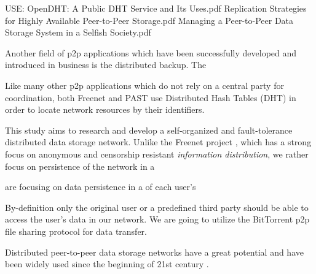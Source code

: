 USE:
OpenDHT: A Public DHT Service and Its Uses.pdf
Replication Strategies for Highly Available Peer-to-Peer Storage.pdf
Managing a Peer-to-Peer Data Storage System in a Selfish Society.pdf


Another field of p2p applications which have been successfully developed
and introduced in business is the distributed backup. The

Like many other p2p applications which do not rely on a central party
for coordination, both Freenet and PAST use Distributed Hash Tables (DHT)
in order to locate network resources by their identifiers.

This study aims to research and develop a self-organized and fault-tolerance
distributed data storage network. Unlike the Freenet project \cite{freenet},
which has a strong focus on anonymous and censorship resistant \emph{information
distribution}, we rather focus on persistence of the network in a

  are focusing on data persistence in a  of each user's

By-definition only the original user
or a predefined third party should be able to access the user's data
in our network. We are going to utilize the BitTorrent \cite{bittorrent-ma}
p2p file sharing protocol for data transfer.


Distributed peer-to-peer data storage networks have a great potential and have
been widely used since the beginning of 21st century
\cite{chord-01}.
